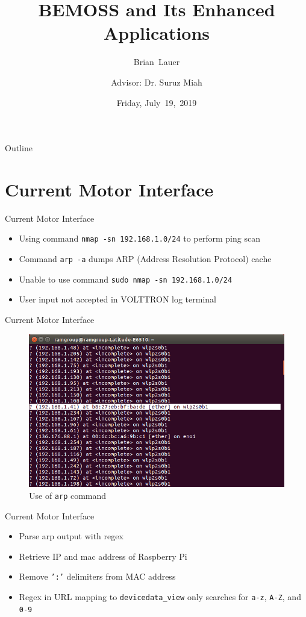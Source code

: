 \documentclass{beamer}
\title[DC Motor Progress]{BEMOSS and Its Enhanced Applications}
\author[B.~Lauer]{Brian~Lauer \\\and
Advisor: Dr. Suruz Miah}
\institute[Bradley University] %
{
  Department of Electrical and Computer Engineering\\
  Bradley University\\
  1501 W. Bradley Avenue\\
  Peoria, IL, 61625, USA
}
\date[July~19,~2019]{Friday, July~19,~2019}
\begin{document}
\begin{frame}
  \titlepage
\end{frame}

\begin{frame}{Outline}
  \tableofcontents
\end{frame}

\section{Current Motor Interface}

\begin{frame}{Current Motor Interface}{}
	\begin{itemize}
		\item Using command \texttt{nmap -sn 192.168.1.0/24} to perform ping scan
		\item Command \texttt{arp -a} dumps ARP (Address Resolution Protocol) cache
		\item Unable to use command \texttt{sudo nmap -sn 192.168.1.0/24}
		\item User input not accepted in VOLTTRON log terminal
	\end{itemize}
\end{frame}

\begin{frame}{Current Motor Interface}{}
	\begin{figure}
		\includegraphics[scale=0.4]{figs/arpoutput.png}
		\caption{Use of \texttt{arp} command}
	\end{figure}
\end{frame}

\begin{frame}{Current Motor Interface}{}
	\begin{itemize}
		\item Parse arp output with regex
		\item Retrieve IP and mac address of Raspberry Pi
		\item Remove \texttt{':'} delimiters from MAC address
		\item Regex in URL mapping to \texttt{devicedata\_view} only searches for \texttt{a-z}, \texttt{A-Z}, and \texttt{0-9}
	\end{itemize}
\end{frame}
\end{document}
